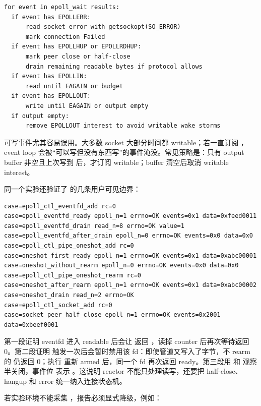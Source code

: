 \begin{lstlisting}[numbers=none,caption={epoll 事件处理的边界检查}]
for event in epoll_wait results:
  if event has EPOLLERR:
      read socket error with getsockopt(SO_ERROR)
      mark connection Failed
  if event has EPOLLHUP or EPOLLRDHUP:
      mark peer close or half-close
      drain remaining readable bytes if protocol allows
  if event has EPOLLIN:
      read until EAGAIN or budget
  if event has EPOLLOUT:
      write until EAGAIN or output empty
  if output empty:
      remove EPOLLOUT interest to avoid writable wake storms
\end{lstlisting}

可写事件尤其容易误用。大多数 socket 大部分时间都 writable；若一直订阅 ，event loop 会被“可以写但没有东西写”的事件淹没。常见策略是：只有 output buffer 非空且上次写到  后，才订阅 writable；buffer 清空后取消 writable interest。

同一个实验还验证了  的几条用户可见边界：

\begin{lstlisting}[numbers=none,caption={epoll 合同实验输出摘要}]
case=epoll_ctl_eventfd_add rc=0
case=epoll_eventfd_ready epoll_n=1 errno=OK events=0x1 data=0xfeed0011
case=epoll_eventfd_drain read_n=8 errno=OK value=1
case=epoll_eventfd_after_drain epoll_n=0 errno=OK events=0x0 data=0x0
case=epoll_ctl_pipe_oneshot_add rc=0
case=oneshot_first_ready epoll_n=1 errno=OK events=0x1 data=0xabc00001
case=oneshot_without_rearm epoll_n=0 errno=OK events=0x0 data=0x0
case=epoll_ctl_pipe_oneshot_rearm rc=0
case=oneshot_after_rearm epoll_n=1 errno=OK events=0x1 data=0xabc00002
case=oneshot_drain read_n=2 errno=OK
case=epoll_ctl_socket_add rc=0
case=socket_peer_half_close epoll_n=1 errno=OK events=0x2001 data=0xbeef0001
\end{lstlisting}

第一段证明 eventfd 进入 readable 后会让  返回 ，读掉 counter 后再次等待返回 0。第二段证明  触发一次后会暂时禁用该 fd：即使管道又写入了字节，不 rearm 的  仍返回 0；执行  重新 armed 后，同一个 fd 再次返回 ready。第三段用  和  观察半关闭，事件位  表示 。这说明 reactor 不能只处理读写，还要把 half-close、hangup 和 error 统一纳入连接状态机。

若实验环境不能采集 ，报告必须显式降级，例如：

